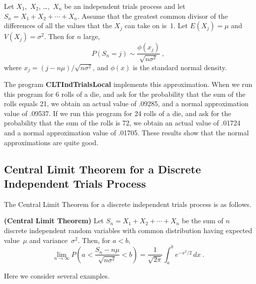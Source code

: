 \begin{theorem}\label{thm 9.3.5}
Let $X_1$,~$X_2$, \dots,~$X_n$ be an independent trials process and let $S_n =
X_1 + X_2 +\cdots+ X_n$.  Assume that the greatest common divisor of the
differences of all the values that the $X_j$ can take on is~1.  Let $E(X_j) =
\mu$ and $V(X_j) = \sigma^2$.  Then for $n$ large,
$$
P(S_n = j) \sim \frac {\phi(x_j)}{\sqrt{n\sigma^2}}\ ,
$$
where $x_j = (j - n\mu)/\sqrt{n\sigma^2}$, and $\phi(x)$ is the standard normal density.
\end{theorem}

The program {\bf CLTIndTrialsLocal} implements this
approximation.  When we run this program for 6 rolls of a die, and ask for the probability that
the sum of the rolls equals 21, we obtain an actual value of .09285, and a normal approximation
value of .09537.  If we run this program for 24 rolls of a die, and ask for the probability that
the sum of the rolls is 72, we obtain an actual value of .01724 and a normal approximation value
of .01705.  These results show that the normal approximations are quite good.

\subsection*{Central Limit Theorem for a Discrete Independent Trials Process}
The Central Limit Theorem for a discrete independent trials process is as follows.

\begin{theorem}{\bf (Central Limit Theorem)}\label{thm 9.3.6} 
Let $S_n = X_1 + X_2 +\cdots+ X_n$ be the sum of $n$
discrete independent random variables with common distribution having expected value~$\mu$ and
variance~$\sigma^2$.  Then, for $a < b$,
$$
\lim_{n \to \infty} P\left( a < \frac {S_n - n\mu}{\sqrt{n\sigma^2}} < b\right)
= \frac 1{\sqrt{2\pi}} \int_a^b e^{-x^2/2}\, dx\ .
$$
\end{theorem}
\par
{}  Here we
consider several examples.

